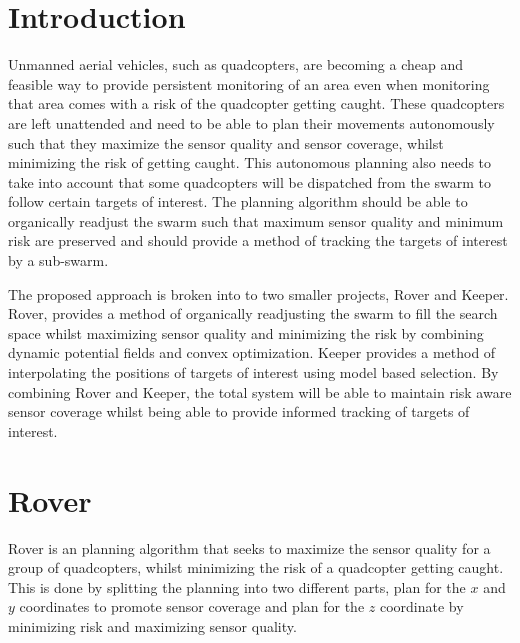 \documentclass[12pt]{article}
\begin{document}
\maketitle

\newpage



\section{Introduction}

Unmanned aerial vehicles, such as quadcopters, are becoming a cheap and
feasible way to provide persistent monitoring of an area even when monitoring
that area comes with a risk of the quadcopter getting caught. These quadcopters
are left unattended and need to be able to plan their movements autonomously
such that they maximize the sensor quality and sensor coverage, whilst
minimizing the risk of getting caught. This autonomous planning also needs to
take into account that some quadcopters will be dispatched from the swarm to
follow certain targets of interest. The planning algorithm should be able to
organically readjust the swarm such that maximum sensor quality and minimum
risk are preserved and should provide a method of tracking the targets of
interest by a sub-swarm.

The proposed approach is broken into to two smaller projects, Rover and Keeper.
Rover, provides a method of organically readjusting the swarm to fill the
search space whilst maximizing sensor quality and minimizing the risk by
combining dynamic potential fields and convex optimization. Keeper provides a
method of interpolating the positions of targets of interest using model based
selection.  By combining Rover and Keeper, the total system will be able to
maintain risk aware sensor coverage whilst being able to provide informed
tracking of targets of interest.

\section{Rover}

Rover is an planning algorithm that seeks to maximize the sensor quality for a
group of quadcopters, whilst minimizing the risk of a quadcopter getting
caught. This is done by splitting the planning into two different parts, plan
for the $x$ and $y$ coordinates to promote sensor coverage and plan for the $z$
coordinate by minimizing risk and maximizing sensor quality.
\end{document}
